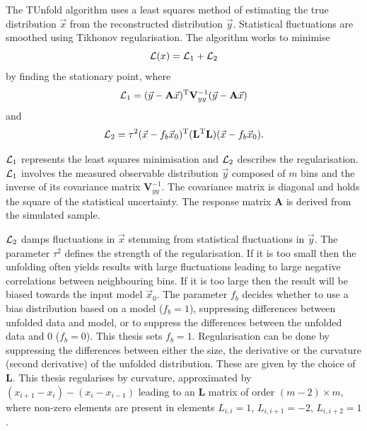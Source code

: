 The TUnfold algorithm uses a least squares method of estimating the true distribution $\vec{x}$ from the reconstructed distribution $\vec{y}$.
Statistical fluctuations are smoothed using Tikhonov regularisation. 
The algorithm works to minimise 
\begin{equation*}
\mathcal{L}(x) = \mathcal{L}_{1}+\mathcal{L}_{2}
\end{equation*}
by finding the stationary point, where
\begin{equation*}
\mathcal{L}_{1} = (\vec{y}-\mathbf{A}\vec{x})^{\mathrm{T}} \mathbf{V}_{yy}^{-1} (\vec{y}-\mathbf{A}\vec{x})
\end{equation*}
and
\begin{equation*}
\mathcal{L}_{2} = \tau^{2}(\vec{x}-f_{b}\vec{x}_{0})^{\mathrm{T}} (\mathbf{L}^{\mathrm{T}}\mathbf{L}) (\vec{x}-f_{b}\vec{x}_{0}).
\end{equation*}

$\mathcal{L}_{1}$ represents the least squares minimisation and $\mathcal{L}_{2}$ describes the regularisation. 
$\mathcal{L}_{1}$ involves the measured observable distribution $\vec{y}$ composed of $m$ bins and the inverse of its covariance matrix $\mathbf{V}_{yy}^{-1}$.
The covariance matrix is diagonal and holds the square of the statistical uncertainty. 
The response matrix $\mathbf{A}$ is derived from the simulated \powhegpythia{} sample.

$\mathcal{L}_{2}$ damps fluctuations in $\vec{x}$ stemming from statistical fluctuations in $\vec{y}$. 
The parameter $\tau^2$ defines the strength of the regularisation.
If it is too small then the unfolding often yields results with large fluctuations leading to large negative correlations between neighbouring bins.
If it is too large then the result will be biased towards the input model $\vec{x}_{0}$.
The parameter $f_{b}$ decides whether to use a bias distribution based on a model ($f_{b} = 1$), suppressing differences between unfolded data and model, or to suppress the differences between the unfolded data and 0 ($f_{b} = 0$). 
This thesis sets $f_{b}=1$.
Regularisation can be done by suppressing the differences between either the size, the derivative or the curvature (second derivative) of the unfolded distribution. 
These are given by the choice of $\mathbf{L}$.
This thesis regularises by curvature, approximated by $(x_{i+1}-x_i) - (x_i - x_{i-1})$ leading to an $\mathbf{L}$ matrix of order $(m-2) \times m$, where non-zero elements are present in elements $L_{i,i} = 1$, $L_{i,i+1} = -2$, $L_{i,i+2} = 1$. 

